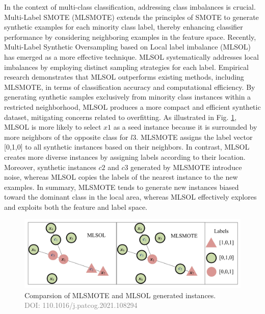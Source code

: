 In the context of multi-class classification, addressing class imbalances is crucial. Multi-Label SMOTE (MLSMOTE) extends the principles of SMOTE to generate synthetic examples for each minority class label, thereby enhancing classifier performance by considering neighboring examples in the feature space. Recently, Multi-Label Synthetic Oversampling based on Local label imbalance (MLSOL) has emerged as a more effective technique. MLSOL systematically addresses local imbalances by employing distinct sampling strategies for each label. Empirical research demonstrates that MLSOL outperforms existing methods, including MLSMOTE, in terms of classification accuracy and computational efficiency. By generating synthetic samples exclusively from minority class instances within a restricted neighborhood, MLSOL produces a more compact and efficient synthetic dataset, mitigating concerns related to overfitting.
As illustrated in Fig. \ref{fig:mlsmote_mlsol}, MLSOL is more likely to select $x1$ as a seed instance because it is surrounded by more neighbors of the opposite class for $l3$. MLSMOTE assigns the label vector [0,1,0] to all synthetic instances based on their neighbors. In contrast, MLSOL creates more diverse instances by assigning labels according to their location. Moreover, synthetic instances $c2$ and $c3$ generated by MLSMOTE introduce noise, whereas MLSOL copies the labels of the nearest instance to the new examples. In summary, MLSMOTE tends to generate new instances biased toward the dominant class in the local area, whereas MLSOL effectively explores and exploits both the feature and label space.
\begin{figure}[!ht]

    \begin{center}
      \includegraphics[width=1\textwidth]{3_State-of-the-art/fig/mlsmote_mlsol.png}
    \end{center}

    \caption{Comparsion of MLSMOTE and MLSOL generated instances.\\ \textcolor{gray}{\fontsize{10}{0}\selectfont DOI: 110.1016/j.patcog.2021.108294}}
    \label{fig:mlsmote_mlsol}

    \end{figure}
    
